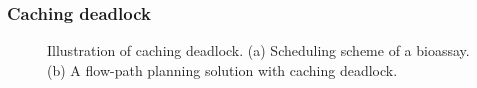 \subsubsection{Caching deadlock}

\begin{figure}[t]
    \centering
    \label{ta}
    \label{tb}
	  \caption{Illustration of caching deadlock. (a) Scheduling scheme of a bioassay. (b) A flow-path planning solution with caching deadlock.}
	  \label{fig:deadlock}
\end{figure}

